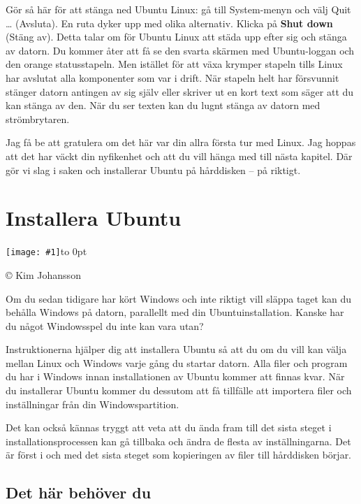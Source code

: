 \documentclass[a4paper,final]{memoir} %
\newcommand{\xrcredit}[1]{\hbox to 0pt{\hspace*{.6\baselineskip}\begin{rotate}{90}{\usefont{T1}{phv}{m}{n}\selectfont\tiny #1}\end{rotate}}}
\newcommand\xintropic[1]{{\texttt{[image: \#1]}\xrcredit{\copyright{} Kim Johansson}}\medskip}
\newcommand\xchapter[2]{\chapter{#2}\begin{center}\xintropic{#1}\end{center}}
\begin{document}

Gör så här för att stänga ned Ubuntu Linux: gå till System-menyn och välj Quit \ldots{} (Avsluta). En ruta dyker upp med olika alternativ. Klicka på \textbf{Shut down} (Stäng av). Detta talar om för Ubuntu Linux att städa upp efter sig och stänga av datorn. Du kommer åter att få se den svarta skärmen med Ubuntu-loggan och den orange statusstapeln. Men istället för att växa krymper stapeln tills Linux har avslutat alla komponenter som var i drift. När stapeln helt har försvunnit stänger datorn antingen av sig själv eller skriver ut en kort text som säger att du kan stänga av den. När du ser texten kan du lugnt stänga av datorn med strömbrytaren. 

Jag få be att gratulera om det här var din allra första tur med Linux. Jag hoppas att det har väckt din nyfikenhet och att du vill hänga med till nästa kapitel. Där gör vi slag i saken och installerar Ubuntu på hårddisken -- på riktigt.



\xchapter{bilder804-all/Installera_Ubuntu}{Installera Ubuntu}\label{cha:installera}



Om du sedan tidigare har kört Windows och inte riktigt vill släppa taget kan du behålla Windows på datorn, parallellt med din Ubuntuinstallation. Kanske har du något Windowsspel du inte kan vara utan?

Instruktionerna hjälper dig att installera Ubuntu så att du om du vill kan välja mellan Linux och Windows varje gång du startar datorn. Alla filer och program du har i Windows innan installationen av Ubuntu kommer att finnas kvar. När du installerar Ubuntu kommer du dessutom att få tillfälle att importera filer och inställningar från din Windowspartition.

Det kan också kännas tryggt att veta att du ända fram till det sista steget i installationsprocessen kan gå tillbaka och ändra de flesta av inställningarna. Det är först i och med det sista steget som kopieringen av filer till hårddisken börjar. 

\section{Det här behöver du}
\end{document}
